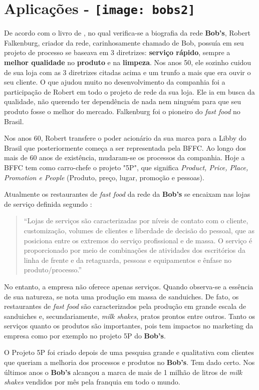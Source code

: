 	\section[Aplicações]{Aplicações - \texttt{[image: bobs2]}}
	\label{sec:processos_aplicacoes}
		De acordo com o livro de \cite{lamonica}, no qual verifica-se a biografia da rede \textbf{Bob’s}, Robert Falkenburg, criador da rede, carinhosamente chamado de Bob, possuía em seu projeto de processo se baseava em 3 diretrizes: \textbf{serviço rápido}, sempre a \textbf{melhor qualidade} no \textbf{produto} e na \textbf{limpeza}. Nos anos 50, ele sozinho cuidou de sua loja com as 3 diretrizes citadas acima e um trunfo a mais que era ouvir o seu cliente. O que ajudou muito no desenvolvimento da companhia foi a participação de Robert em todo o projeto de rede da sua loja. Ele ia em busca da qualidade, não querendo ter dependência de nada nem ninguém para que seu produto fosse o melhor do mercado. Falkenburg foi o pioneiro do \emph{fast food} no Brasil.

		Nos anos 60, Robert transfere o poder acionário da sua marca para a Libby do Brasil que posteriormente começa a ser representada pela BFFC. Ao longo dos mais de 60 anos de existência, mudaram-se os processos da companhia. Hoje a BFFC tem como carro-chefe o projeto "5P", que significa \emph{Product, Price, Place, Promotion e People} (Produto, preço, lugar, promoção e pessoas).

		Atualmente os restaurantes de \emph{fast food} da rede da \textbf{Bob’s} se encaixam nas lojas de serviço definida segundo \cite{slack}:

		\begin{quotation}
			“Lojas de serviços são caracterizadas por níveis de contato com o cliente, customização, volumes de clientes e liberdade de decisão do pessoal, que as posiciona entre os extremos do serviço profissional e de massa. O serviço é proporcionado por meio de combinações de atividades dos escritórios da linha de frente e da retaguarda, pessoas e equipamentos e ênfase no produto/processo.” 
		\end{quotation}

		No entanto, a empresa não oferece apenas serviços. Quando observa-se a essência de sua natureza, se nota uma produção em massa de sanduiches. De fato, os restaurantes de \emph{fast food} são caracterizados pela produção em grande escala de sanduiches e, secundariamente, \emph{milk shakes}, pratos prontos entre outros. Tanto os serviços quanto os produtos são importantes, pois tem impactos no marketing da empresa como por exemplo no projeto 5P do \textbf{Bob’s}.

		O Projeto 5P foi criado depois de uma pesquisa grande e qualitativa com clientes que queriam a melhoria dos processos e produtos no \textbf{Bob’s}. Tem dado certo. Nos últimos anos o \textbf{Bob’s} alcançou a marca de mais de 1 milhão de litros de \emph{milk shakes} vendidos por mês pela franquia em todo o mundo. \cite{lamonica}




	
